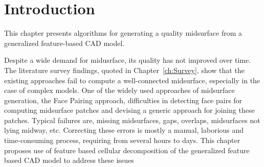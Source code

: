 
\section{Introduction}
This chapter presents algorithms for generating a quality midsurface from a generalized feature-based CAD model. 

Despite a wide demand for midusrface, its quality has not improved over time. The literature survey findings, quoted in Chapter~\ref{ch:Survey}, show that the existing approaches fail to compute a well-connected midsurface, especially in the case of complex models. One of the widely used approaches of midsurface generation, the Face Pairing approach,  difficulties in detecting face pairs for computing midsurface patches and devising a generic  approach for joining these patches. Typical failures are, missing midsurfaces, gaps, overlaps, midsurfaces not lying midway,  etc. Correcting these errors is mostly a manual, laborious and time-consuming process, requiring from several hours to days. This chapter proposes use of feature based cellular decomposition of the generalized feature based CAD model to address these issues 

